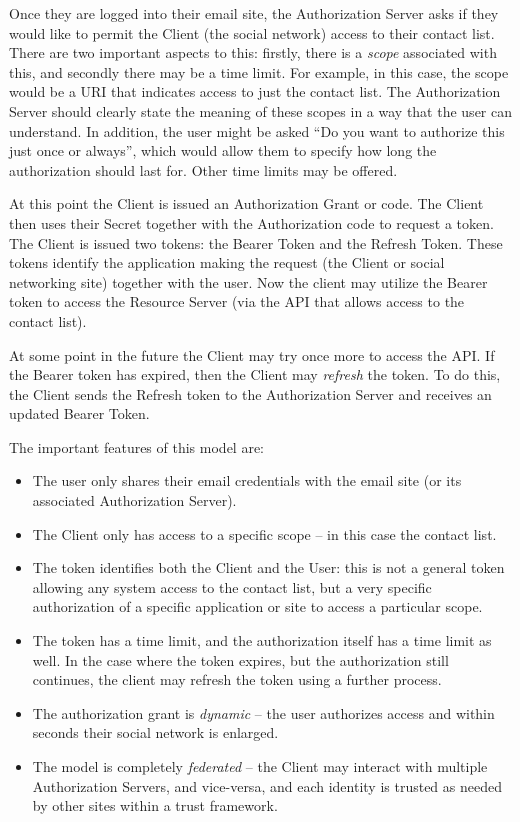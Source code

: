 \documentclass{llncs}
\begin{document}
Once they are logged into their email site, the Authorization Server asks if they would like to 
permit the Client (the social network) access to their contact list. There are two important aspects
to this: firstly, there is a \emph{scope} associated with this, and secondly there may be a time limit. 
For example, in this case, the scope would be a URI that indicates access to just the contact list. The Authorization Server 
should clearly state the meaning of these scopes in a way that the user can understand.
In addition, the user might be asked ``Do you want to authorize this just once or always'', which would allow them
to specify how long the authorization should last for. Other time limits may be offered.

At this point the Client is issued an Authorization Grant or code. The Client then
uses their Secret together with the Authorization code to request a token. The Client is issued two tokens: the Bearer Token and the Refresh Token. These tokens identify
the application making the request (the Client or social networking site) together with the user.
Now the client may utilize the Bearer token to access the Resource Server (via the API that allows access to the 
contact list). 


At some point in the future the Client may try once more to access the API. 
If the Bearer token has expired, then the Client may \emph{refresh} the token. To do this, the 
Client sends the Refresh token to the Authorization Server and receives an updated Bearer Token.

The important features of this model are:
\begin{itemize}
\item The user only shares their email credentials with the email site (or its associated Authorization Server).
\item The Client only has access to a specific scope -- in this case the contact list.
\item The token identifies both the Client and the User: this is not a general token allowing 
any system access to the contact list, but a very specific authorization of a specific application or site to
access a particular scope.
\item The token has a time limit, and the authorization itself has a time limit as well. In the case 
where the token expires, but the authorization still continues, the client may refresh the token using a further
process.
\item The authorization grant is \emph{dynamic} -- the user authorizes access and within seconds 
their social network is enlarged. 
\item The model is completely \emph{federated} -- the Client may interact with multiple Authorization
Servers, and vice-versa, and each identity is trusted as needed by other sites within a 
trust framework.
\end{itemize}
\end{document}

